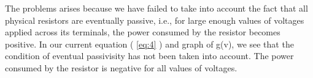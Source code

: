 \documentclass[12pt]{article}
\newcommand*{\myref}[1]{%
  \begingroup
    \hypersetup{
      linkcolor=linkequation,
      linkbordercolor=linkequation,
    }%
    \ref{#1}%
  \endgroup
}
\begin{document}
The problems arises because we have failed to take into account the fact that all physical resistors are eventually passive, i.e., for large enough values of voltages applied across its terminals, the power consumed by the resistor becomes positive. \linebreak
In our current equation (\myref{eq:4}) and graph of g(v), we see that the condition of eventual passivisity has not been taken into account. The power consumed by the resistor is negative for all values of voltages.
\end{document}
